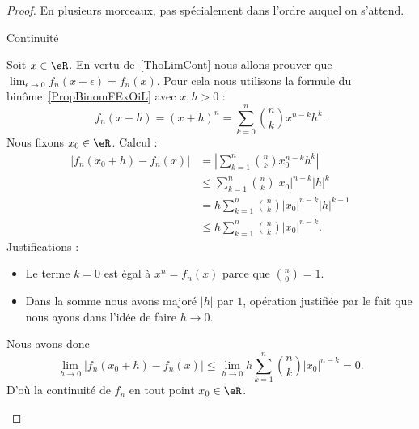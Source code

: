 \begin{proof}
    En plusieurs morceaux, pas spécialement dans l'ordre auquel on s'attend.
    \begin{subproof}
        \item[Continuité]

            Soit \( x\in \eR\). En vertu de~\ref{ThoLimCont} nous allons prouver que \( \lim_{\epsilon\to 0}f_n(x+\epsilon)=f_n(x)\). Pour cela nous utilisons la formule du binôme~\ref{PropBinomFExOiL} avec \( x,h>0\) :
            \begin{equation}
                f_n(x+h)=(x+h)^n=\sum_{k=0}^n{n\choose k}x^{n-k}h^k.
            \end{equation}
            Nous fixons \( x_0\in \eR\). Calcul :
            \begin{subequations}
                \begin{align}
                    | f_n(x_0+h)-f_n(x) |&=| \sum_{k=1}^n{n\choose k}x_0^{n-k}h^k |\\
                    &\leq \sum_{k=1}^n{n\choose k}| x_0 |^{n-k} |h|^k\\
                    &=h\sum_{k=1}^n{n\choose k}| x_0 |^{n-k}| h |^{k-1}\\
                    &\leq h\sum_{k=1}^n{n\choose k}| x_0 |^{n-k}.
                \end{align}
            \end{subequations}
            Justifications :
            \begin{itemize}
                \item
                   Le terme \( k=0\) est égal à \( x^n=f_n(x)\) parce que \( {n\choose 0}=1\).
               \item
                   Dans la somme nous avons majoré \( | h |\) par \( 1\), opération justifiée par le fait que nous ayons dans l'idée de faire \( h\to 0\).
            \end{itemize}
            Nous avons donc
            \begin{equation}
                \lim_{h\to 0} | f_n(x_0+h)-f_n(x) | \leq\lim_{h\to 0}  h\sum_{k=1}^n{n\choose k}| x_0 |^{n-k}=0.
            \end{equation}
            D'où la continuité de \( f_n\) en tout point \( x_0\in \eR\).


\end{subproof}
\end{proof}
